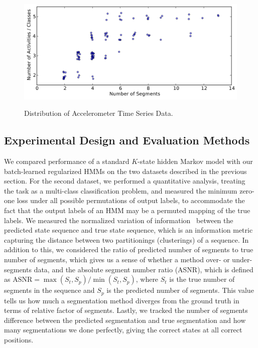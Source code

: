 \documentclass[letterpaper]{article}
\begin{document}
\begin{figure}[htbp]
  \centering
    \includegraphics[width=1.\linewidth]{images/distribution_of_dataset_segments.pdf}
    \label{fig:distribution}
    \vspace{-0.5cm}
    \caption{\small{Distribution of Accelerometer Time Series Data.}}
\end{figure}
\vspace{-0.5cm}
\subsection{Experimental Design and Evaluation Methods}
\vspace{-0.1cm}
We compared performance of a standard $K$-state hidden Markov model with our
batch-learned regularized HMMs on the two datasets described in the previous
section. For the second dataset, we performed a quantitative analysis, treating
the task as a multi-class classification problem, and measured the minimum
zero-one loss under all possible permutations of output labels, to accommodate
the fact that the output labels of an HMM may be a permuted mapping of the true
labels. We measured the normalized variation of information~\cite{meila} between
the predicted state sequence and true state sequence, which is an information
metric capturing the distance between two
partitionings (clusterings) of a sequence. In addition to this, we considered
the ratio of predicted number of segments to true number of segments, which
gives us a sense of whether a method over- or under-segments data, and the
absolute segment number ratio (ASNR), which is defined as
$\text{ASNR} = \max(S_t, S_p)/\min(S_t, S_p)$, 
where $S_t$ is the true number of segments in the sequence and $S_p$ is the predicted number of segments. This value tells us how much a segmentation method diverges from the ground truth in terms of relative factor of segments. Lastly, we tracked the number of segments difference between the predicted segmentation and true segmentation and how many segmentations we done perfectly, giving the correct states at all correct positions.
\end{document}

